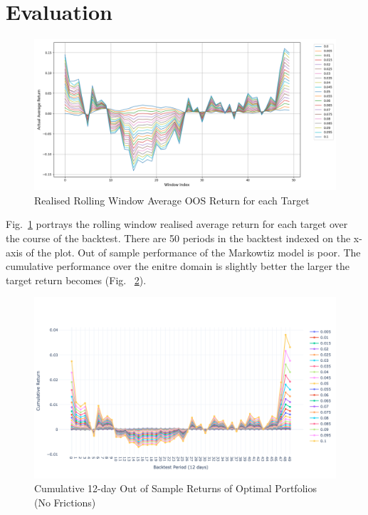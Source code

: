 \documentclass[12pt,twoside]{article}
\begin{document}
\section{Evaluation}

\begin{figure}[htbp!]
\centering
\includegraphics[width = 1.0\hsize]{./figures/Realised_Rolling_Window_Average_OOS_Return_cpp.png} %
\caption{Realised Rolling Window Average OOS Return for each Target} 
\label{fig:OOS_rets}
\end{figure}


Fig.~\ref{fig:OOS_rets} portrays the rolling window realised average return for each target over the course of the backtest. There are 50 periods in the backtest indexed on the x-axis of the plot. Out of sample performance of the Markowtiz model is poor. The cumulative performance over the enitre domain is slightly better the larger the target return becomes (Fig. ~\ref{fig:cuml_rets}).\\

\begin{figure}[]
\centering 
\includegraphics[width = 1.0\hsize]{./figures/Cumulative_returns.png} 
\caption{Cumulative 12-day Out of Sample Returns of Optimal Portfolios (No Frictions)}
\label{fig:cuml_rets}
\end{figure}
\end{document}
